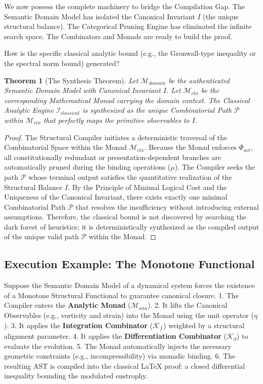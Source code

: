 \documentclass[12pt,openany]{extbook}
\theoremstyle{plain}
\newtheorem{theorem}{Theorem}[chapter]
\theoremstyle{definition}
\begin{document}
We now possess the complete machinery to bridge the Compilation Gap. The Semantic Domain Model has isolated the Canonical Invariant $I$ (the unique structural balance). The Categorical Pruning Engine has eliminated the infinite search space. The Combinators and Monads are ready to build the proof.

How is the specific classical analytic bound (e.g., the Gronwall-type inequality or the spectral norm bound) generated?

\begin{theorem}[The Synthesis Theorem]
Let $\mathcal{M}_{domain}$ be the authenticated Semantic Domain Model with Canonical Invariant $I$. Let $\mathcal{M}_{ctx}$ be the corresponding Mathematical Monad carrying the domain context. The Classical Analytic Engine $\mathcal{I}_{classical}$ is synthesized as the unique Combinatorial Path $\mathcal{P}$ within $\mathcal{M}_{ctx}$ that perfectly maps the primitive observables to $I$.
\end{theorem}

\begin{proof}
The Structural Compiler initiates a deterministic traversal of the Combinatorial Space within the Monad $\mathcal{M}_{ctx}$. 
Because the Monad enforces $\Phi_{act}$, all constitutionally redundant or presentation-dependent branches are automatically pruned during the binding operations ($\mu$).
The Compiler seeks the path $\mathcal{P}$ whose terminal output satisfies the quantitative realization of the Structural Balance $I$.
By the Principle of Minimal Logical Cost and the Uniqueness of the Canonical Invariant, there exists exactly one minimal Combinatorial Path $\mathcal{P}$ that resolves the insufficiency without introducing external assumptions.
Therefore, the classical bound is not discovered by searching the dark forest of heuristics; it is deterministically synthesized as the compiled output of the unique valid path $\mathcal{P}$ within the Monad.
\end{proof}

\subsection{Execution Example: The Monotone Functional}
Suppose the Semantic Domain Model of a dynamical system forces the existence of a Monotone Structural Functional to guarantee canonical closure. 
1. The Compiler enters the \textbf{Analytic Monad} ($\mathcal{M}_{ana}$).
2. It lifts the Canonical Observables (e.g., vorticity and strain) into the Monad using the unit operator ($\eta$).
3. It applies the \textbf{Integration Combinator} ($\mathcal{K}_{\int}$) weighted by a structural alignment parameter.
4. It applies the \textbf{Differentiation Combinator} ($\mathcal{K}_{\partial}$) to evaluate the evolution.
5. The Monad automatically injects the necessary geometric constraints (e.g., incompressibility) via monadic binding.
6. The resulting AST is compiled into the classical LaTeX proof: a closed differential inequality bounding the modulated enstrophy.
\end{document}
